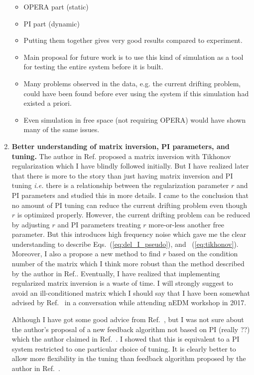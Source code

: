 \begin{enumerate}
\begin{itemize}
\item OPERA part (static)
\item PI part (dynamic)
\item Putting them together gives very good results compared to experiment.
\item Main proposal for future work is to use this kind of simulation as a tool for testing the entire system before it is built.
\item Many problems observed in the data, e.g. the current drifting problem, could have been found before ever using the system if this simulation had existed a priori.
\item Even simulation in free space (not requiring OPERA) would have shown many of the same issues.
\end{itemize}

\item {\bf Better understanding of matrix inversion, PI parameters, and tuning.} The author in Ref.\cite{bea} proposed a matrix inversion with Tikhonov regularization which I have blindly followed initially. But I have realized later that there is more to the story than just having matrix inversion and PI tuning {\it i.e.} there is a relationship between the regularization parameter $r$ and PI parameters and studied this in more details. I came to the conclusion that no amount of PI tuning can reduce the current drifting problem even though $r$ is optimized properly.  However, the current drifting problem can be reduced by adjusting $r$ and PI parameters treating $r$ more-or-less another free parameter. But this introduces high frequency noise which gave me the clear understanding to describe Eqs.~(\ref{eq:del_I_pseudo}), and ~(\ref{eq:tikhonov}). Moreover, I also a propose a new method to find $r$ based on the condition number of the matrix which I think more robust than the method described by the author in Ref.\cite{bea}. Eventually, I have realized that implementing regularized matrix inversion is a waste of time. I will strongly suggest to avoid an ill-conditioned matrix which I should say that I have been somewhat advised by Ref.~\cite{rawlikpriv} in a conversation while attending nEDM workshop in 2017. 

Although I have got some good advice from Ref.~\cite{rawlikpriv}, but I was not sure about the author's proposal of a new feedback algorithm not based on PI (really ??) which the author claimed in Ref.~\cite{rawlik}. I showed that this is equivalent to a PI system restricted to one particular choice of tuning.  It is clearly better to allow more flexibility in the tuning than feedback algorithm proposed by the author in Ref.~\cite{rawlik}.



\end{enumerate}
